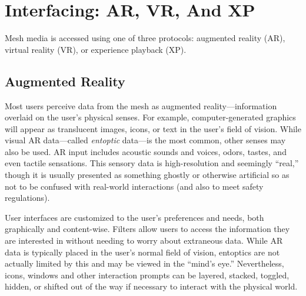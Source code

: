\section{Interfacing: AR, VR, And XP}

Mesh media is accessed using one of three protocols: 
augmented reality (AR), virtual reality (VR), or experience
playback (XP).

\subsection{Augmented Reality}

Most users perceive data from the mesh as augmented
reality—information overlaid on the user's
physical senses. For example, computer-generated 
graphics will appear as translucent images, icons, 
or text in the user's field of vision. While visual AR 
data—called  \textit{entoptic} data—is the most common, 
other senses may also be used. AR input includes 
acoustic sounds and voices, odors, tastes, and 
even tactile sensations. This sensory data is high-resolution
and seemingly ``real,'' though it is usually
presented as something ghostly or otherwise
artificial so as not to be confused with real-world 
interactions (and also to meet safety regulations).

User interfaces are customized to the user's preferences
and needs, both graphically and content-wise.
Filters allow users to access the information they 
are interested in without needing to worry about 
extraneous data. While AR data is typically placed 
in the user's normal field of vision, entoptics are not 
actually limited by this and may be viewed in the 
``mind's eye.'' Nevertheless, icons, windows and other 
interaction prompts can be layered, stacked, toggled, 
hidden, or shifted out of the way if necessary to interact
with the physical world.

